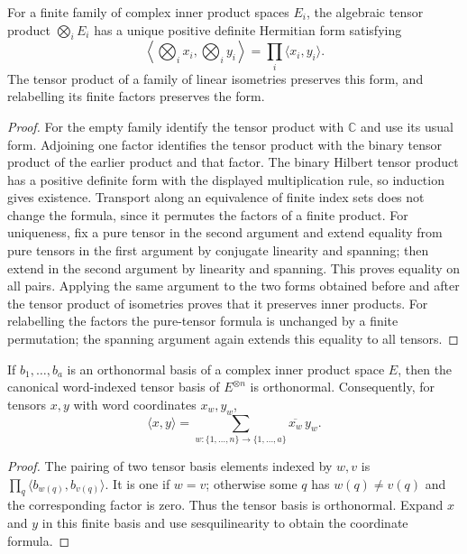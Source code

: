 \begin{lemma}
\label{lem:finite-hilbert-tensor}
\leanok
For a finite family of complex inner product spaces $E_i$, the
algebraic tensor product $\bigotimes_i E_i$ has a unique positive
definite Hermitian form satisfying
\[
 \left\langle\bigotimes_i x_i,\bigotimes_i y_i\right\rangle
 =\prod_i\langle x_i,y_i\rangle.
\]
The tensor product of a family of linear isometries preserves this
form, and relabelling its finite factors preserves the form.
\end{lemma}
\begin{proof}
For the empty family identify the tensor product with $\mathbb C$
and use its usual form. Adjoining one factor identifies the tensor
product with the binary tensor product of the earlier product and
that factor. The binary Hilbert tensor product has a positive
definite form with the displayed multiplication rule, so induction
gives existence. Transport along an equivalence of finite index
sets does not change the formula, since it permutes the factors of
a finite product. For uniqueness, fix a pure tensor in the second
argument and extend equality from pure tensors in the first argument
by conjugate linearity and spanning; then extend in the second
argument by linearity and spanning. This proves equality on all
pairs. Applying the same argument to the two forms obtained before
and after the tensor product of isometries proves that it preserves
inner products. For relabelling the factors the pure-tensor formula
is unchanged by a finite permutation; the spanning argument again
extends this equality to all tensors.
\end{proof}

\begin{lemma}
\label{lem:orthonormal-tensor-coordinates}
\leanok
If $b_1,\ldots,b_a$ is an orthonormal basis of a complex inner product
space $E$, then the canonical word-indexed tensor basis of $E^{\otimes n}$
is orthonormal. Consequently, for tensors $x,y$ with word coordinates
$x_w,y_w$,
\[
 \langle x,y\rangle=\sum_{w:\{1,\ldots,n\}\to\{1,\ldots,a\}}
   \overline{x_w}\,y_w.
\]
\end{lemma}
\begin{proof}
The pairing of two tensor basis elements indexed by $w,v$ is
$\prod_q\langle b_{w(q)},b_{v(q)}\rangle$. It is one if $w=v$;
otherwise some $q$ has $w(q)\ne v(q)$ and the corresponding factor
is zero. Thus the tensor basis is orthonormal. Expand $x$ and $y$ in
this finite basis and use sesquilinearity to obtain the coordinate formula.
\end{proof}

